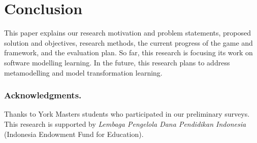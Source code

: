 \documentclass[runningheads,a4paper]{llncs}
\begin{document}
\section{Conclusion}
This paper explains our research motivation and problem statements, proposed solution and objectives, research methods, the current progress of the game and framework, and the evaluation plan. So far, this research is focusing its work on software modelling learning. In the future, this research plans to address metamodelling and model transformation learning. 

\subsubsection*{Acknowledgments.} Thanks to York Masters students who participated in our preliminary surveys. This research is supported by \emph{Lembaga Pengelola Dana Pendidikan Indonesia} (Indonesia Endowment Fund for Education). 

 

\end{document}
